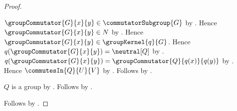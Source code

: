 \begin{proof}
\begin{subproof}
\begin{subproof}
            $\groupCommutator{G}{x}{y}\in
                \commutatorSubgroup{G}$ by
                .
            Hence $\groupCommutator{G}{x}{y}\in N$ by
                .
            Hence $\groupCommutator{G}{x}{y}\in
                \groupKernel{q}{G}$.
            Hence $q(\groupCommutator{G}{x}{y})=\neutral[Q]$ by
                .
            $q(\groupCommutator{G}{x}{y})=
                \groupCommutator{Q}{q(x)}{q(y)}$ by
                .
            Hence $\commutesIn{Q}{U}{V}$ by
                .
            Follows by .
        \end{subproof}
        $Q$ is a group by .
        Follows by .
    \end{subproof}
    Follows by \auto.
\end{proof}
